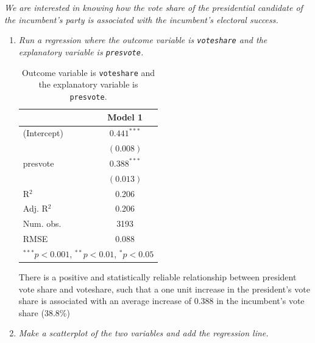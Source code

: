 \documentclass[12pt,letterpaper]{article}
\begin{document}
	\noindent \emph{We are interested in knowing how the vote share of the presidential candidate of the incumbent's party is associated with the incumbent's electoral success.}
	\vspace{.25cm}
	\begin{enumerate}
		\item \emph{Run a regression where the outcome variable is \texttt{voteshare} and the explanatory variable is \texttt{presvote}.}
	

\begin{table}[h!]
	\begin{center}
		\caption{\footnotesize{Outcome variable is \texttt{voteshare} and the explanatory variable is \texttt{presvote}.}} 
		
		\begin{tabular}{l c }
			\hline
			& Model 1 \\
			\hline
			(Intercept) & $0.441^{***}$ \\
            & $(0.008)$     \\
presvote    & $0.388^{***}$ \\
            & $(0.013)$     \\
\hline
R$^2$       & 0.206         \\
Adj. R$^2$  & 0.206         \\
Num. obs.   & 3193          \\
RMSE        & 0.088         \\
			\hline
			\multicolumn{2}{l}{\scriptsize{$^{***}p<0.001$, $^{**}p<0.01$, $^*p<0.05$}}
		\end{tabular}
		
	\end{center}
\end{table}

\noindent There is a positive and statistically reliable relationship between president vote share and voteshare, such that a one unit increase in the president's vote share is associated with an average increase of 0.388 in the incumbent's vote share (38.8\%)	
	\vspace{.25cm}
	
		\item \emph{Make a scatterplot of the two variables and add the regression line. }
			\vspace{.25cm}
		 


\end{enumerate}
\end{document}
